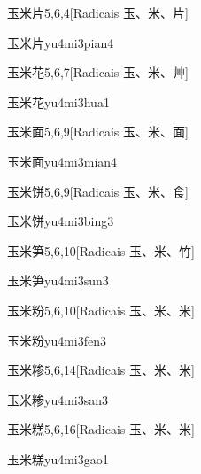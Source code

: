 \begin{entry}{玉米片}{5,6,4}[Radicais ⽟、⽶、⽚]
  \begin{phonetics}{玉米片}{yu4mi3pian4}
  \end{phonetics}
\end{entry}

\begin{entry}{玉米花}{5,6,7}[Radicais ⽟、⽶、⾋]
  \begin{phonetics}{玉米花}{yu4mi3hua1}
  \end{phonetics}
\end{entry}

\begin{entry}{玉米面}{5,6,9}[Radicais ⽟、⽶、⾯]
  \begin{phonetics}{玉米面}{yu4mi3mian4}
  \end{phonetics}
\end{entry}

\begin{entry}{玉米饼}{5,6,9}[Radicais ⽟、⽶、⾷]
  \begin{phonetics}{玉米饼}{yu4mi3bing3}
  \end{phonetics}
\end{entry}

\begin{entry}{玉米笋}{5,6,10}[Radicais ⽟、⽶、⽵]
  \begin{phonetics}{玉米笋}{yu4mi3sun3}
  \end{phonetics}
\end{entry}

\begin{entry}{玉米粉}{5,6,10}[Radicais ⽟、⽶、⽶]
  \begin{phonetics}{玉米粉}{yu4mi3fen3}
  \end{phonetics}
\end{entry}

\begin{entry}{玉米糁}{5,6,14}[Radicais ⽟、⽶、⽶]
  \begin{phonetics}{玉米糁}{yu4mi3san3}
  \end{phonetics}
\end{entry}

\begin{entry}{玉米糕}{5,6,16}[Radicais ⽟、⽶、⽶]
  \begin{phonetics}{玉米糕}{yu4mi3gao1}
  \end{phonetics}
\end{entry}


